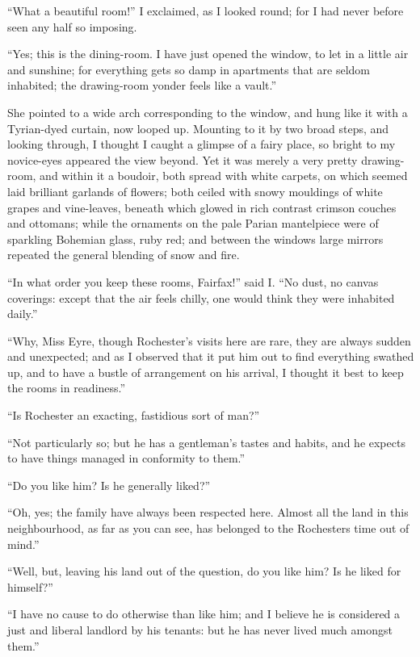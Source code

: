 \enquote{What a beautiful room!} I exclaimed, as I looked round; for I
had never before seen any half so imposing.

\enquote{Yes; this is the dining-room. I have just opened the window,
to let in a little air and sunshine; for everything gets so damp in
apartments that are seldom inhabited; the drawing-room yonder feels like
a vault.}

She pointed to a wide arch corresponding to the window, and hung like it
with a Tyrian-dyed curtain, now looped up. Mounting to it by two broad
steps, and looking through, I thought I caught a glimpse of a fairy
place, so bright to my novice-eyes appeared the view beyond. Yet it was
merely a very pretty drawing-room, and within it a boudoir, both spread
with white carpets, on which seemed laid brilliant garlands of flowers;
both ceiled with snowy mouldings of white grapes and vine-leaves,
beneath which glowed in rich contrast crimson couches and ottomans;
while the ornaments on the pale Parian mantelpiece were of sparkling
Bohemian glass, ruby red; and between the windows large mirrors repeated
the general blending of snow and fire.

\enquote{In what order you keep these rooms, \Mrs{} Fairfax!} said I\@. 
\enquote{No dust, no canvas coverings: except that the air feels chilly,
one would think they were inhabited daily.}

\enquote{Why, Miss Eyre, though \Mr{} Rochester's visits here are rare,
they are always sudden and unexpected; and as I observed that it put him
out to find everything swathed up, and to have a bustle of arrangement
on his arrival, I thought it best to keep the rooms in readiness.}

\enquote{Is \Mr{} Rochester an exacting, fastidious sort of man?}

\enquote{Not particularly so; but he has a gentleman's tastes and
habits, and he expects to have things managed in conformity to them.}

\enquote{Do you like him? Is he generally liked?}

\enquote{Oh, yes; the family have always been respected here. Almost
all the land in this neighbourhood, as far as you can see, has belonged
to the Rochesters time out of mind.}

\enquote{Well, but, leaving his land out of the question, do you like
him? Is he liked for himself?}

\enquote{I have no cause to do otherwise than like him; and I believe he
is considered a just and liberal landlord by his tenants: but he has
never lived much amongst them.}

